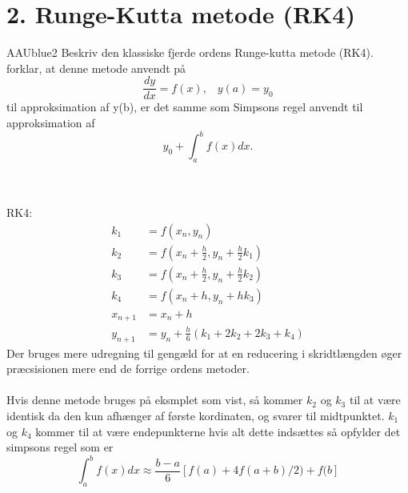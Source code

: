 \section*{2. Runge-Kutta metode (RK4)}
% 
%
\begin{color}{AAUblue2}
%
Beskriv den klassiske fjerde ordens Runge-kutta metode (RK4). forklar, at denne metode anvendt på
$$\frac{dy}{dx}=f(x), \phantom{...}y(a)=y_0$$
til approksimation af y(b), er det samme som Simpsons regel anvendt til approksimation af 
$$y_0+\int^b_a f(x)dx. $$
% 
\end{color}
\\\\
RK4:\\
\begin{align*}
k_1&=f(x_n,y_n)\\
k_2&=f(x_n+\frac{h}{2},y_n+\frac{h}{2}k_1)\\
k_3&=f(x_n+\frac{h}{2},y_n+\frac{h}{2}k_2)\\
k_4&=f(x_n+h,y_n+h k_3)\\
x_{n+1}&=x_n+h\\
y_{n+1}&=y_n+\frac{h}{6}(k_1+2k_2+2k_3+k_4)
\end{align*}
Der bruges mere udregning til gengæld for at en reducering i skridtlængden øger præcsisionen mere end de forrige ordens metoder.\\\\
% 
%
Hvis denne metode bruges på eksmplet som vist, så kommer $k_2$ og $k_3$ til at være identisk da den kun afhænger af første kordinaten, og svarer til midtpunktet. $k_1$ og $k_4$ kommer til at være endepunkterne hvis alt dette indsættes så opfylder det simpsons regel som er 
$$\int_a^bf(x)dx \approx \frac{b-a}{6}[f(a)+4f(a+b)/2)+f(b]$$


